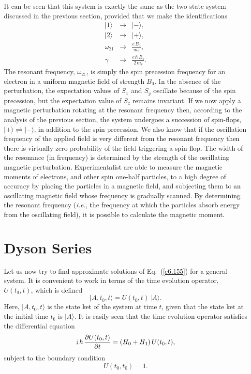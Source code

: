 It can be seen that this system is exactly the same as the two-state system
discussed in the previous section, provided that we make the identifications
\begin{eqnarray}
|1 \rangle &\rightarrow & |-\rangle,\\[0.5ex]
|2 \rangle &\rightarrow & |+\rangle,\\[0.5ex]
\omega_{21} &\rightarrow & \frac{e \,B_0}{m_e},\\[0.5ex]
\gamma &\rightarrow & \frac{e\,\hbar\, B_1}{2\,m_e}.
\end{eqnarray}
The resonant frequency, $\omega_{21}$, is simply the spin precession frequency
for an electron in a uniform magnetic field of strength $B_0$. In the
absence of the perturbation, the expectation values of $S_x$ and $S_y$ 
oscillate because of the spin precession, but the expectation value
of $S_z$ remains invariant. If we now apply a magnetic perturbation rotating
at the resonant frequency then, according to the analysis of the previous
section, the system undergoes a succession of spin-flops,
$|+\rangle \rightleftharpoons |-\rangle$, in addition to the spin
precession. We also know that if the oscillation frequency of the
applied field is very different from the resonant frequency then there is
virtually zero probability of the field triggering a spin-flop. The width
of the resonance (in frequency) is determined by the strength of the 
oscillating magnetic perturbation. Experimentalist are able to measure the
magnetic moments of electrons, and other spin one-half particles, to a
high degree of accuracy by placing the particles in a magnetic field, 
and subjecting them to an oscillating magnetic field whose frequency is
gradually  scanned. 
By determining the resonant frequency ({\em i.e.}, the frequency at which the
particles absorb energy from the oscillating field), it is possible to
calculate the magnetic moment. 

\section{Dyson Series}
Let us now try to find approximate solutions of Eq.~(\ref{e6.155}) for a general
system. It is convenient to work in terms of the time evolution
operator, $U(t_0, t)$, which is defined
\begin{equation}
|A, t_0, t\rangle = U(t_0, t) \,|A\rangle.
\end{equation}
Here, $|A, t_0, t\rangle$ is the state ket  of the
system at time $t$, given that the state ket at the initial
time $t_0$ is $|A\rangle$. It is easily seen that the time evolution operator
satisfies the differential equation
\begin{equation}
{\rm i}\, \hbar\, \frac{\partial U(t_0, t)}{\partial t} = (H_0 + H_1)\,
U(t_0, t),
\end{equation}
subject to  the boundary condition
\begin{equation}
U(t_0, t_0 ) = 1.
\end{equation}

